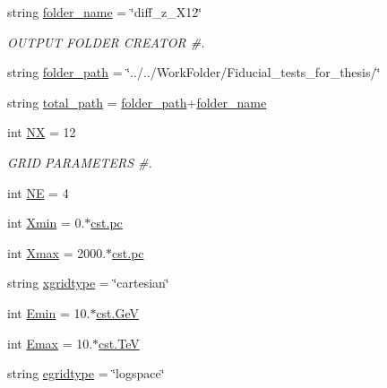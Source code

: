 \begin{DoxyCompactItemize}
\item 
string \hyperlink{namespacenamelist__diff_ab0429c76e7ec948becd63466be73bff5}{folder\+\_\+name} = \char`\"{}diff\+\_\+z\+\_\+\+X12\char`\"{}
\begin{DoxyCompactList}\small\item\em O\+U\+T\+P\+UT F\+O\+L\+D\+ER C\+R\+E\+A\+T\+OR \#. \end{DoxyCompactList}\item 
string \hyperlink{namespacenamelist__diff_aaa5e2a88407b65c86c9af2720dc4c0d1}{folder\+\_\+path} = \char`\"{}../../Work\+Folder/Fiducial\+\_\+tests\+\_\+for\+\_\+thesis/\char`\"{}
\item 
string \hyperlink{namespacenamelist__diff_a0007e3a54cb05f97fcd1ad82d77bc38d}{total\+\_\+path} = \hyperlink{namespacenamelist__diff_aaa5e2a88407b65c86c9af2720dc4c0d1}{folder\+\_\+path}+\hyperlink{namespacenamelist__diff_ab0429c76e7ec948becd63466be73bff5}{folder\+\_\+name}
\item 
int \hyperlink{namespacenamelist__diff_a5f804e54790790cf5efa10f25184157f}{NX} = 12
\begin{DoxyCompactList}\small\item\em G\+R\+ID P\+A\+R\+A\+M\+E\+T\+E\+RS \#. \end{DoxyCompactList}\item 
int \hyperlink{namespacenamelist__diff_ab7da180f3c9b27543568db4cb02b362a}{NE} = 4
\item 
int \hyperlink{namespacenamelist__diff_aff81a5db56ae8b2a95eb1b37710c77e9}{Xmin} = 0.$\ast$\hyperlink{constants_8h_a2884cd030c4c825754349a525a1d06ce}{cst.\+pc}
\item 
int \hyperlink{namespacenamelist__diff_a19c5df6452fce440c77288fb85948253}{Xmax} = 2000.$\ast$\hyperlink{constants_8h_a2884cd030c4c825754349a525a1d06ce}{cst.\+pc}
\item 
string \hyperlink{namespacenamelist__diff_a811169548b607be0676fe9fe1dd05f55}{xgridtype} = \char`\"{}cartesian\char`\"{}
\item 
int \hyperlink{namespacenamelist__diff_aafc262ff32658f44f1086b13486f3884}{Emin} = 10.$\ast$\hyperlink{constants_8h_aec0e126d9991db8ad0b26139f5860568}{cst.\+GeV}
\item 
int \hyperlink{namespacenamelist__diff_addaaa575c316acdbc3af9898fc68fa14}{Emax} = 10.$\ast$\hyperlink{constants_8h_a7f801e1f6821bc6baf0652ed2496e5e9}{cst.\+TeV}
\item 
string \hyperlink{namespacenamelist__diff_a7f4e3a990587cf5a897b0aa0c6f405a2}{egridtype} = \char`\"{}logspace\char`\"{}

\end{DoxyCompactItemize}

